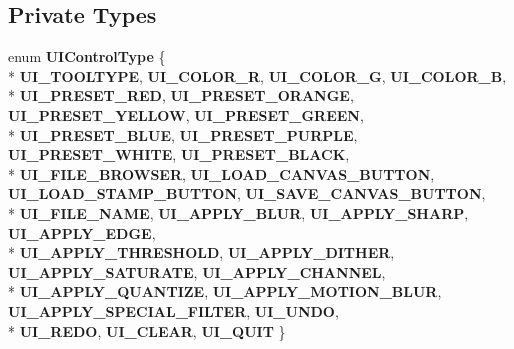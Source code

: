 \subsection*{Private Types}
\begin{DoxyCompactItemize}
\item 
enum {\bfseries U\+I\+Control\+Type} \{ \\*
{\bfseries U\+I\+\_\+\+T\+O\+O\+L\+T\+Y\+PE}, 
{\bfseries U\+I\+\_\+\+C\+O\+L\+O\+R\+\_\+R}, 
{\bfseries U\+I\+\_\+\+C\+O\+L\+O\+R\+\_\+G}, 
{\bfseries U\+I\+\_\+\+C\+O\+L\+O\+R\+\_\+B}, 
\\*
{\bfseries U\+I\+\_\+\+P\+R\+E\+S\+E\+T\+\_\+\+R\+ED}, 
{\bfseries U\+I\+\_\+\+P\+R\+E\+S\+E\+T\+\_\+\+O\+R\+A\+N\+GE}, 
{\bfseries U\+I\+\_\+\+P\+R\+E\+S\+E\+T\+\_\+\+Y\+E\+L\+L\+OW}, 
{\bfseries U\+I\+\_\+\+P\+R\+E\+S\+E\+T\+\_\+\+G\+R\+E\+EN}, 
\\*
{\bfseries U\+I\+\_\+\+P\+R\+E\+S\+E\+T\+\_\+\+B\+L\+UE}, 
{\bfseries U\+I\+\_\+\+P\+R\+E\+S\+E\+T\+\_\+\+P\+U\+R\+P\+LE}, 
{\bfseries U\+I\+\_\+\+P\+R\+E\+S\+E\+T\+\_\+\+W\+H\+I\+TE}, 
{\bfseries U\+I\+\_\+\+P\+R\+E\+S\+E\+T\+\_\+\+B\+L\+A\+CK}, 
\\*
{\bfseries U\+I\+\_\+\+F\+I\+L\+E\+\_\+\+B\+R\+O\+W\+S\+ER}, 
{\bfseries U\+I\+\_\+\+L\+O\+A\+D\+\_\+\+C\+A\+N\+V\+A\+S\+\_\+\+B\+U\+T\+T\+ON}, 
{\bfseries U\+I\+\_\+\+L\+O\+A\+D\+\_\+\+S\+T\+A\+M\+P\+\_\+\+B\+U\+T\+T\+ON}, 
{\bfseries U\+I\+\_\+\+S\+A\+V\+E\+\_\+\+C\+A\+N\+V\+A\+S\+\_\+\+B\+U\+T\+T\+ON}, 
\\*
{\bfseries U\+I\+\_\+\+F\+I\+L\+E\+\_\+\+N\+A\+ME}, 
{\bfseries U\+I\+\_\+\+A\+P\+P\+L\+Y\+\_\+\+B\+L\+UR}, 
{\bfseries U\+I\+\_\+\+A\+P\+P\+L\+Y\+\_\+\+S\+H\+A\+RP}, 
{\bfseries U\+I\+\_\+\+A\+P\+P\+L\+Y\+\_\+\+E\+D\+GE}, 
\\*
{\bfseries U\+I\+\_\+\+A\+P\+P\+L\+Y\+\_\+\+T\+H\+R\+E\+S\+H\+O\+LD}, 
{\bfseries U\+I\+\_\+\+A\+P\+P\+L\+Y\+\_\+\+D\+I\+T\+H\+ER}, 
{\bfseries U\+I\+\_\+\+A\+P\+P\+L\+Y\+\_\+\+S\+A\+T\+U\+R\+A\+TE}, 
{\bfseries U\+I\+\_\+\+A\+P\+P\+L\+Y\+\_\+\+C\+H\+A\+N\+N\+EL}, 
\\*
{\bfseries U\+I\+\_\+\+A\+P\+P\+L\+Y\+\_\+\+Q\+U\+A\+N\+T\+I\+ZE}, 
{\bfseries U\+I\+\_\+\+A\+P\+P\+L\+Y\+\_\+\+M\+O\+T\+I\+O\+N\+\_\+\+B\+L\+UR}, 
{\bfseries U\+I\+\_\+\+A\+P\+P\+L\+Y\+\_\+\+S\+P\+E\+C\+I\+A\+L\+\_\+\+F\+I\+L\+T\+ER}, 
{\bfseries U\+I\+\_\+\+U\+N\+DO}, 
\\*
{\bfseries U\+I\+\_\+\+R\+E\+DO}, 
{\bfseries U\+I\+\_\+\+C\+L\+E\+AR}, 
{\bfseries U\+I\+\_\+\+Q\+U\+IT}
 \}\hypertarget{classFlashPhotoApp_a0c9137aecfb6a08bd53335d6b6a5c678}{}\label{classFlashPhotoApp_a0c9137aecfb6a08bd53335d6b6a5c678}


\end{DoxyCompactItemize}
